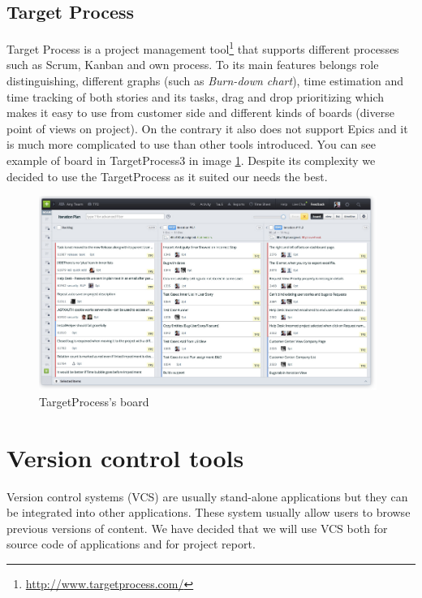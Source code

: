 \subsection{Target Process} 
Target Process is a project management tool\footnote{\url{http://www.targetprocess.com/}} that supports different processes such as Scrum, Kanban and own process. 
To its main features belongs role distinguishing, different graphs (such as \emph{Burn-down chart}), time estimation and time tracking of both stories and its tasks, drag and drop prioritizing which makes it easy to use from customer side and different kinds of boards (diverse point of views on project).
On the contrary it also does not support Epics and it is much more complicated to use than other tools introduced.
You can see example of board in TargetProcess3 in image \ref{img:targetp}. Despite its complexity we decided to use the TargetProcess as it suited our needs the best.

\begin{figure}[!t]
	\centering
		\includegraphics[width=11cm]{preliminaryStudies/targetp.png}
	\caption{TargetProcess's board}
	\label{img:targetp}
\end{figure}


\section{Version control tools}
Version control systems (VCS) are usually stand-alone applications but they can be integrated into other applications. These system usually allow users to browse previous versions of content. We have decided that we will use VCS both for source code of applications and for project report. 

